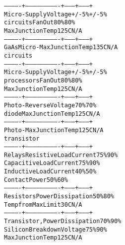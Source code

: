 \begin{boxedminipage}{\funcwidth}
\begin{alltt}
-------------+----------------------------+---------+---------+
 Micro-      {\textbar} Supply Voltage             {\textbar}  +/-5\%  {\textbar}  +/-5\%  {\textbar}
 circuits    {\textbar} Fan Out                    {\textbar}   80\%   {\textbar}   80\%   {\textbar}
             {\textbar} Max Junction Temp          {\textbar}  125C   {\textbar}   N/A   {\textbar}
-------------+----------------------------+---------+---------+
 GaAs Micro- {\textbar} Max Junction Temp          {\textbar}  135C   {\textbar}   N/A   {\textbar}
 circuits    {\textbar}                            {\textbar}         {\textbar}         {\textbar}
-------------+----------------------------+---------+---------+
 Micro-      {\textbar} Supply Voltage             {\textbar}  +/-5\%  {\textbar}  +/-5\%  {\textbar}
 processors  {\textbar} Fan Out                    {\textbar}   80\%   {\textbar}   80\%   {\textbar}
             {\textbar} Max Junction Temp          {\textbar}  125C   {\textbar}   N/A   {\textbar}
-------------+----------------------------+---------+---------+
 Photo-      {\textbar} Reverse Voltage            {\textbar}   70\%   {\textbar}    70\%  {\textbar}
 diode       {\textbar} Max Junction Temp          {\textbar}  125C   {\textbar}   N/A   {\textbar}
-------------+----------------------------+---------+---------+
 Photo-      {\textbar} Max Junction Temp          {\textbar}  125C   {\textbar}   N/A   {\textbar}
 transistor  {\textbar}                            {\textbar}         {\textbar}         {\textbar}
-------------+----------------------------+---------+---------+
 Relays      {\textbar} Resistive Load Current     {\textbar}   75\%   {\textbar}   90\%   {\textbar}
             {\textbar} Capacitive Load Current    {\textbar}   75\%   {\textbar}   90\%   {\textbar}
             {\textbar} Inductive Load Current     {\textbar}   40\%   {\textbar}   50\%   {\textbar}
             {\textbar} Contact Power              {\textbar}   50\%   {\textbar}   60\%   {\textbar}
-------------+----------------------------+---------+---------+
 Resistors   {\textbar} Power Dissipation          {\textbar}   50\%   {\textbar}   80\%   {\textbar}
             {\textbar} Temp from Max Limit        {\textbar}   30C   {\textbar}   N/A   {\textbar}
-------------+----------------------------+---------+---------+
 Transistor, {\textbar} Power Dissipation          {\textbar}   70\%   {\textbar}   90\%   {\textbar}
 Silicon     {\textbar} Breakdown Voltage          {\textbar}   75\%   {\textbar}   90\%   {\textbar}
             {\textbar} Max Junction Temp          {\textbar}  125C   {\textbar}   N/A   {\textbar}

\end{alltt}
\end{boxedminipage}
